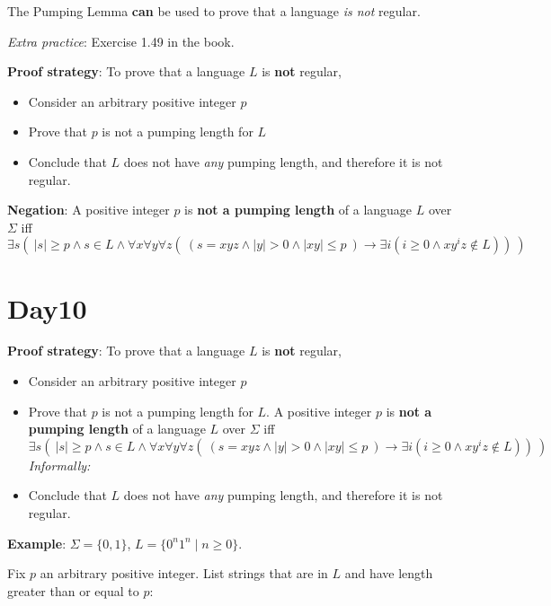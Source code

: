 \documentclass[12pt, oneside]{article}
\begin{document}
{\Large The Pumping Lemma {\bf can} be used to prove that a language {\it is not} regular.}

{\it Extra practice}: Exercise 1.49 in the book.


\vfill

{\bf Proof strategy}: To prove that a language $L$ is {\bf not} regular, 
\begin{itemize}
    \item Consider an arbitrary positive integer $p$
    \item Prove that $p$ is not a pumping length for $L$
    \item Conclude that $L$ does not have {\it any} pumping length, and therefore it is not regular.
\end{itemize}


{\bf Negation}: A positive integer  $p$  is {\bf not a pumping length} of a language  $L$ over  $\Sigma$  iff
\[
\exists s \left(~  |s| \geq  p \wedge s \in L \wedge \forall x \forall y \forall z  \left( ~\left( s = xyz \wedge 
|y| > 0 \wedge |xy| \leq p~ \right) \to \exists i  (  i \geq 0  \wedge xy^iz  \notin L ) \right) ~\right) 
\] \vfill
\section*{Day10}



{\bf Proof strategy}: To prove that a language $L$ is {\bf not} regular, 
\begin{itemize}
    \item Consider an arbitrary positive integer $p$
    \item Prove that $p$ is not a pumping length for $L$. A positive integer  $p$  is {\bf not a pumping length} of a language  $L$ over  $\Sigma$  iff
    \[
    \exists s \left(~  |s| \geq  p \wedge s \in L \wedge \forall x \forall y \forall z  \left( ~\left( s = xyz \wedge 
    |y| > 0 \wedge |xy| \leq p~ \right) \to \exists i  (  i \geq 0  \wedge xy^iz  \notin L ) \right) ~\right) 
    \]
    {\it Informally: }
    
\vfill

    \item Conclude that $L$ does not have {\it any} pumping length, and therefore it is not regular.
\end{itemize}

\vfill
{\bf Example}: $\Sigma  =  \{0,1\}$, $L = \{ 0^n 1^n \mid n  \geq 0\}$.

Fix $p$ an arbitrary positive integer. List strings that are in $L$ and have length  greater than or equal  to $p$:
\end{document}

